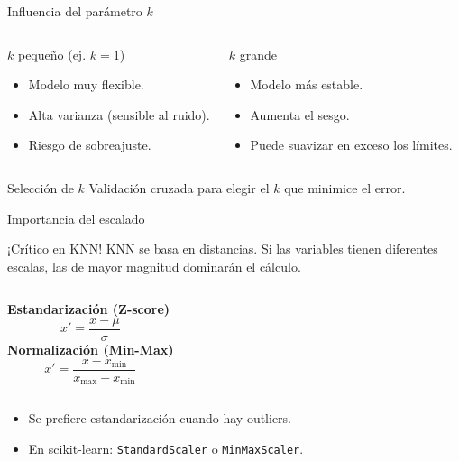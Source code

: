 \documentclass[aspectratio=169, 10pt, xcolor=table]{beamer}
\begin{document}
\begin{frame}{Influencia del parámetro $k$}
    \begin{columns}[t]
        \begin{block}{$k$ pequeño (ej. $k=1$)}
            \begin{itemize}
                \item Modelo muy flexible.
                \item Alta varianza (sensible al ruido).
                \item Riesgo de sobreajuste.
            \end{itemize}
        \end{block}
        \begin{block}{$k$ grande}
            \begin{itemize}
                \item Modelo más estable.
                \item Aumenta el sesgo.
                \item Puede suavizar en exceso los límites.
            \end{itemize}
        \end{block}
    \end{columns}
    \vspace{0.3cm}
    \begin{exampleblock}{Selección de $k$}
        Validación cruzada para elegir el $k$ que minimice el error.
    \end{exampleblock}
\end{frame}

\begin{frame}{Importancia del escalado}
    \begin{alertblock}{¡Crítico en KNN!}
        KNN se basa en distancias. Si las variables tienen diferentes escalas, las de mayor magnitud dominarán el cálculo.
    \end{alertblock}
    \begin{columns}[t]
        \textbf{Estandarización (Z-score)}
        \[
        x' = \frac{x - \mu}{\sigma}
        \]
        \textbf{Normalización (Min-Max)}
        \[
        x' = \frac{x - x_{\min}}{x_{\max} - x_{\min}}
        \]
    \end{columns}
    \vspace{0.2cm}
    \begin{itemize}
        \item Se prefiere estandarización cuando hay outliers.
        \item En scikit-learn: \texttt{StandardScaler} o \texttt{MinMaxScaler}.
    \end{itemize}
\end{frame}
\end{document}
